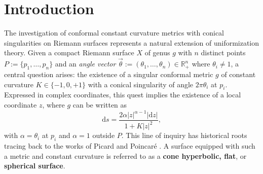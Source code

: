 \documentclass[pdflatex,sn-mathphys]{sn-jnl}%
\numberwithin{equation}{section}
\theoremstyle{thmstyleone}%
\begin{document}


\maketitle


\pagestyle{plain}

\textcolor{black}{\tableofcontents}

\section{Introduction}\label{sec:intro}

The investigation of conformal constant curvature metrics with conical singularities on Riemann surfaces represents a natural extension of uniformization theory. Given a compact Riemann surface \(X\) of genus \(g\) with \(n\) distinct points \(P := \{p_1, \ldots, p_n\}\) and an \emph{angle vector} \(\vec{\theta} := (\theta_1, \ldots, \theta_n) \in \mathbb{R}_+^n\) where \(\theta_i \neq 1\), a central question arises: the existence of a singular conformal metric \(g\) of constant curvature \(K \in \{-1, 0, +1\}\) with a conical singularity of angle \(2\pi\theta_i\) at \(p_i\).
Expressed in complex coordinates, this quest implies the existence of a local coordinate \(z\), where \(g\) can be written as
\[ \mathrm{d}s = \frac{2\alpha \lvert z \rvert^{\alpha-1} \lvert \mathrm{d}z \rvert}{1 + K \lvert z \rvert^2}, \]
with \(\alpha = \theta_i\) at \(p_i\) and \(\alpha = 1\) outside \(P\). This line of inquiry has historical roots tracing back to the works of Picard and Poincar\'{e} \cite{Poin1898, Pic1905}. A surface equipped with such a metric and constant curvature is referred to as a \textbf{cone hyperbolic, flat}, or \textbf{spherical surface}.
\end{document}
